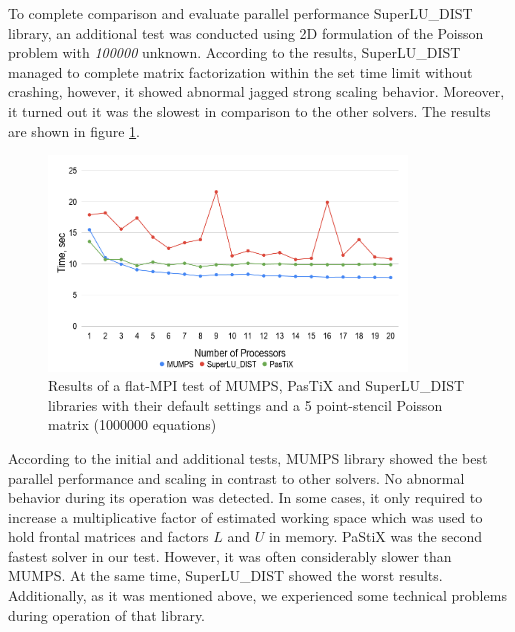 
To complete comparison and evaluate parallel performance SuperLU\_DIST library, an additional test was conducted using 2D formulation of the Poisson problem with \textit{100000} unknown. According to the results, SuperLU\_DIST managed to complete matrix factorization within the set time limit without crashing, however, it showed abnormal jagged strong scaling behavior. Moreover, it turned out it was the slowest in comparison to the other solvers. The results are shown in figure \ref{fig:5-point-stencil-solvers-comparison}.\\



\figpointer{\ref{fig:5-point-stencil-solvers-comparison}}
\begin{figure}[htpb]
  \centering
  \includegraphics[width=0.85\textwidth]{figures/chapter-2/solvers-comparison-5-point-stencil.png}
\caption{Results of a flat-MPI test of MUMPS, PasTiX and SuperLU\_DIST libraries with their default settings and a 5 point-stencil Poisson matrix (1000000  equations)}
\label{fig:5-point-stencil-solvers-comparison}
\end{figure}


According to the initial and additional tests, MUMPS library showed the best parallel performance and scaling in contrast to other solvers. No abnormal behavior during its operation was detected. In some cases, it only required to increase a multiplicative factor of estimated working space which was used to hold frontal matrices and factors $L$ and $U$ in memory. PaStiX was the second fastest solver in our test. However,  it was often considerably slower than MUMPS. At the same time, SuperLU\_DIST showed the worst results. Additionally, as it was mentioned above, we experienced some technical problems during operation of that library.\\


